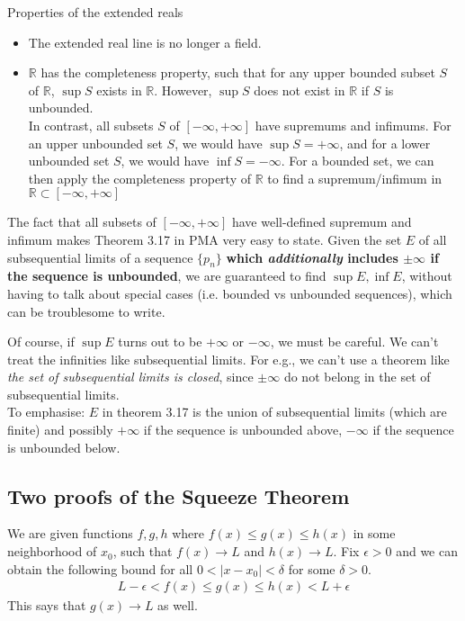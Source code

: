 \documentclass{article}
\begin{document}
Properties of the extended reals
\begin{itemize}
	\item The extended real line is no longer a field.
	\item $\mathbb{R}$ has the completeness property, such that for any upper bounded subset $S$ of $\mathbb{R}$, $\sup S$ exists in $\mathbb{R}$. However, $\sup S$ does not exist in $\mathbb{R}$ if $S$ is unbounded.\\
	 In contrast, all subsets $S$ of $[-\infty, +\infty]$ have supremums and infimums. For an upper unbounded set $S$, we would have $\sup S = + \infty$, and for a lower unbounded set $S$, we would have $\inf S = -\infty$. For a bounded set, we can then apply the completeness property of $\mathbb{R}$ to find a supremum/infimum in $\mathbb{R}\subset [-\infty, +\infty]$
\end{itemize}

The fact that all subsets of $[-\infty, +\infty]$ have well-defined supremum and infimum makes Theorem 3.17 in PMA very easy to state. Given the set $E$ of all subsequential limits of a sequence $\{p_n\}$ \textbf{which \textit{additionally} includes $\pm \infty$ if the sequence is unbounded}, we are guaranteed to find $\sup E, \inf E$, without having to talk about special cases (i.e. bounded vs unbounded sequences), which can be troublesome to write.

Of course, if $\sup E$ turns out to be $+\infty$ or $-\infty$, we must be careful. We can't treat the infinities like subsequential limits. For e.g., we can't use a theorem like \textit{the set of subsequential limits is closed}, since $\pm \infty$ do not belong in the set of subsequential limits.\\
To emphasise: $E$ in theorem 3.17 is the union of subsequential limits (which are finite) and possibly $+\infty$ if the sequence is unbounded above, $-\infty$ if the sequence is unbounded below.


\subsection{Two proofs of the Squeeze Theorem}
We are given functions $f,g,h$ where $f(x)\leq g(x)\leq h(x)$ in some neighborhood of $x_0$, such that $f(x)\rightarrow L$ and $h(x)\rightarrow L$. Fix $\epsilon > 0$ and we can obtain the following bound for all $0 < |x - x_0| < \delta$ for some $\delta > 0$.
\begin{align*}
	L - \epsilon < f(x) \leq g(x) \leq h(x) < L + \epsilon
\end{align*}
This says that $g(x)\rightarrow L$ as well.
\end{document}
